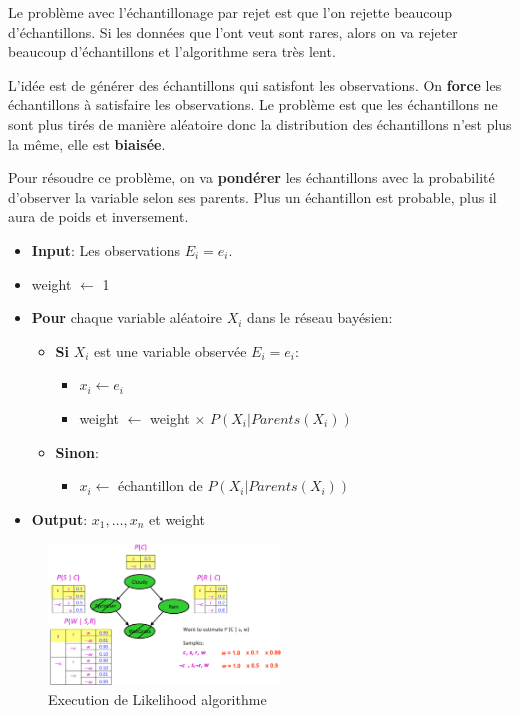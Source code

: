 Le problème avec l'échantillonage par rejet est que l'on rejette beaucoup d'échantillons. Si 
les données que l'ont veut sont rares, alors on va rejeter beaucoup d'échantillons et l'algorithme sera très lent.

L'idée est de générer des échantillons qui satisfont les observations. On \textbf{force} les échantillons à satisfaire les observations.
Le problème est que les échantillons ne sont plus tirés de manière aléatoire donc la distribution des échantillons n'est plus la même, elle est \textbf{biaisée}.

Pour résoudre ce problème, on va \textbf{pondérer} les échantillons avec la probabilité d'observer la variable selon ses parents.
Plus un échantillon est probable, plus il aura de poids et inversement.

\newpage
\begin{itemize}[label=\textbullet]
    \item \textbf{Input}: Les observations $E_i=e_i$. 
    \item weight $\leftarrow$ 1
    \item \textbf{Pour} chaque variable aléatoire $X_i$ dans le réseau bayésien:
        \begin{itemize}[label=\textbullet]
            \item \textbf{Si} $X_i$ est une variable observée $E_i=e_i$:
                \begin{itemize}[label=\textbullet]
                    \item $x_i \leftarrow e_i$
                    \item weight $\leftarrow$ weight $\times$ $P(X_i | Parents(X_i))$
                \end{itemize}
            \item \textbf{Sinon}:
                \begin{itemize}[label=\textbullet]
                    \item $x_i \leftarrow$ échantillon de $P(X_i | Parents(X_i))$
                \end{itemize}
        \end{itemize}
    \item \textbf{Output}: $x_1, \dots, x_n$ et weight
\end{itemize}

\begin{figure}[H]
    \begin{center}
        \includegraphics[width=0.55\textwidth]{pictures/likelihood.png}
    \end{center}
    \caption{Execution de Likelihood algorithme}\label{fig:likelihood}
\end{figure}

